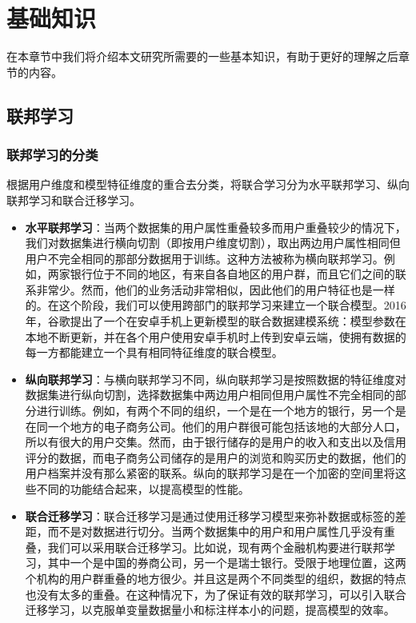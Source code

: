\chapter{基础知识}
\label{ch2}
在本章节中我们将介绍本文研究所需要的一些基本知识，有助于更好的理解之后章节的内容。

\section{联邦学习}

\subsection{联邦学习的分类}

根据用户维度和模型特征维度的重合去分类，将联合学习分为水平联邦学习、纵向联邦学习和联合迁移学习。
\begin{itemize}
\item \textbf{水平联邦学习}：当两个数据集的用户属性重叠较多而用户重叠较少的情况下，我们对数据集进行横向切割（即按用户维度切割），取出两边用户属性相同但用户不完全相同的那部分数据用于训练。这种方法被称为横向联邦学习。例如，两家银行位于不同的地区，有来自各自地区的用户群，而且它们之间的联系非常少。然而，他们的业务活动非常相似，因此他们的用户特征也是一样的。在这个阶段，我们可以使用跨部门的联邦学习来建立一个联合模型。2016年，谷歌提出了一个在安卓手机上更新模型的联合数据建模系统：模型参数在本地不断更新，并在各个用户使用安卓手机时上传到安卓云端，使拥有数据的每一方都能建立一个具有相同特征维度的联合模型。

\item \textbf{纵向联邦学习}：与横向联邦学习不同，纵向联邦学习是按照数据的特征维度对数据集进行纵向切割，选择数据集中两边用户相同但用户属性不完全相同的部分进行训练。例如，有两个不同的组织，一个是在一个地方的银行，另一个是在同一个地方的电子商务公司。他们的用户群很可能包括该地的大部分人口，所以有很大的用户交集。然而，由于银行储存的是用户的收入和支出以及信用评分的数据，而电子商务公司储存的是用户的浏览和购买历史的数据，他们的用户档案并没有那么紧密的联系。纵向的联邦学习是在一个加密的空间里将这些不同的功能结合起来，以提高模型的性能。

\item \textbf{联合迁移学习}：联合迁移学习是通过使用迁移学习模型来弥补数据或标签的差距，而不是对数据进行切分。当两个数据集中的用户和用户属性几乎没有重叠，我们可以采用联合迁移学习。比如说，现有两个金融机构要进行联邦学习，其中一个是中国的券商公司，另一个是瑞士银行。受限于地理位置，这两个机构的用户群重叠的地方很少。并且这是两个不同类型的组织，数据的特点也没有太多的重叠。在这种情况下，为了保证有效的联邦学习，可以引入联合迁移学习，以克服单变量数据量小和标注样本小的问题，提高模型的效率。

\end{itemize}

